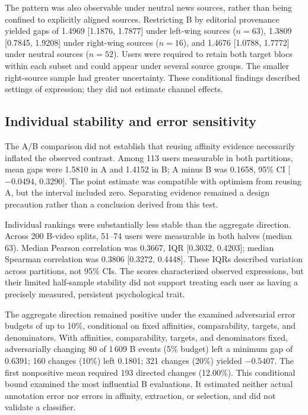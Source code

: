 \documentclass[conference,letterpaper]{IEEEtran}
\begin{document}
The pattern was also observable under neutral news sources, rather than being confined to explicitly aligned sources. Restricting B by editorial provenance yielded gaps of 1.4969 [1.1876, 1.7877] under left-wing sources ($n=63$), 1.3809 [0.7845, 1.9208] under right-wing sources ($n=16$), and 1.4676 [1.0788, 1.7772] under neutral sources ($n=52$). Users were required to retain both target blocs within each subset and could appear under several source groups. The smaller right-source sample had greater uncertainty. These conditional findings described settings of expression; they did not estimate channel effects.

\subsection{Individual stability and error sensitivity}
The A/B comparison did not establish that reusing affinity evidence necessarily inflated the observed contrast. Among 113 users measurable in both partitions, mean gaps were 1.5810 in A and 1.4152 in B; A minus B was 0.1658, 95\% CI [$-0.0494$, 0.3290]. The point estimate was compatible with optimism from reusing A, but the interval included zero. Separating evidence remained a design precaution rather than a conclusion derived from this test.

Individual rankings were substantially less stable than the aggregate direction. Across 200 B-video splits, 51--74 users were measurable in both halves (median 63). Median Pearson correlation was 0.3667, IQR [0.3032, 0.4203]; median Spearman correlation was 0.3806 [0.3272, 0.4448]. These IQRs described variation across partitions, not 95\% CIs. The scores characterized observed expressions, but their limited half-sample stability did not support treating each user as having a precisely measured, persistent psychological trait.

The aggregate direction remained positive under the examined adversarial error budgets of up to 10\%, conditional on fixed affinities, comparability, targets, and denominators. With affinities, comparability, targets, and denominators fixed, adversarially changing 80 of 1\,609 B events (5\% budget) left a minimum gap of 0.6391; 160 changes (10\%) left 0.1801; 321 changes (20\%) yielded $-0.5407$. The first nonpositive mean required 193 directed changes (12.00\%). This conditional bound examined the most influential B evaluations. It estimated neither actual annotation error nor errors in affinity, extraction, or selection, and did not validate a classifier.
\end{document}
